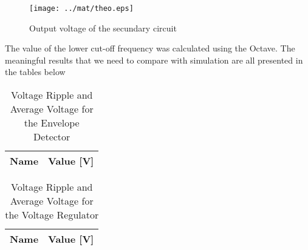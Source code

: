 \begin{figure}[H] \centering
\texttt{[image: ../mat/theo.eps]}
\caption{Output voltage of the secundary circuit}
\label{fig:mat2}
\end{figure}

The value of the lower cut-off frequency was calculated using the Octave. The meaningful results that we need to compare with simulation are all presented in the tables below

\begin{table}[H]
  \centering
  \begin{tabular}{|l|r|}
    \hline    
    {\bf Name} & {\bf Value [V]} \\ \hline
    
  \end{tabular}
  \caption{Voltage Ripple and Average Voltage for the Envelope Detector}
  \label{tab:mat3}
\end{table}


\begin{table}[H]
  \centering
  \begin{tabular}{|l|r|}
    \hline    
    {\bf Name} & {\bf Value [V]} \\ \hline
    
  \end{tabular}
  \caption{Voltage Ripple and Average Voltage for the Voltage Regulator}
  \label{tab:mat7}
\end{table}



